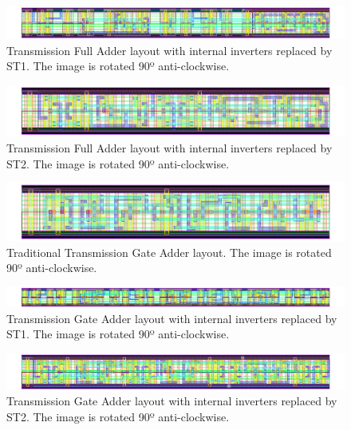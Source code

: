 \documentclass[pgmicro,diss,english]{iiufrgs}
\begin{document}
\newpage
\begin{figure}[]
\centering
\includegraphics[width=1.5\textwidth, angle =90]{TFAST1.png}
\caption{Transmission Full Adder layout with internal inverters replaced by ST1. The image is rotated 90º anti-clockwise.}
\label{fig:TFAST1}
\end{figure}

\newpage
\begin{figure}[]
\centering
\includegraphics[width=1.5\textwidth, angle =90]{TFAST2.png}
\caption{Transmission Full Adder layout with internal inverters replaced by ST2. The image is rotated 90º anti-clockwise.}
\label{fig:TFAST2}
\end{figure}






\newpage


\begin{figure}[]
\centering
\includegraphics[width=1.5\textwidth, angle =90]{TGA.png}
\caption{Traditional Transmission Gate Adder layout. The image is rotated 90º anti-clockwise.}
\label{fig:TGA}
\end{figure}

\newpage
\begin{figure}[]
\centering
\includegraphics[width=1.5\textwidth, angle =90]{TGAST1.png}
\caption{Transmission Gate Adder layout with internal inverters replaced by ST1. The image is rotated 90º anti-clockwise.}
\label{fig:TGAST1}
\end{figure}

\newpage
\begin{figure}[]
\centering
\includegraphics[width=1.5\textwidth, angle =90]{TGAST2.png}
\caption{Transmission Gate Adder layout with internal inverters replaced by ST2. The image is rotated 90º anti-clockwise.}
\label{fig:TGAST2}
\end{figure}
\end{document}
